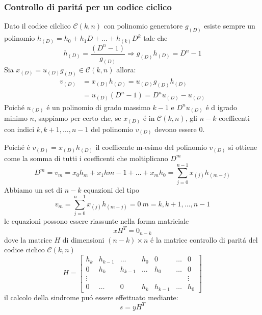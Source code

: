         \subsubsection{Controllo di paritá per un codice ciclico}
            Dato il codice cilclico $\mathcal{C}(k,n)$ con polinomio generatore $g_{(D)}$ esiste sempre un polinomio 
            $h_{(D)} = h_0+h_1D+\dots+h_{(k)}D^k$ tale che 
            \[
                h_{(D)} = \frac{(D^n-1)}{g_{(D)}} \Rightarrow g_{(D)}h_{(D)} = D^n-1    
            \]
            Sia $x_{(D)} = u_{(D)}g_{(D)}\in \mathcal{C}(k,n)$ allora:
            \begin{align}
                v_{(D)} &= x_{(D)}h_{(D)} = u_{(D)}g_{(D)}h_{(D)}\nonumber \\
                        &= u_{(D)}(D^n-1) = D^nu_{(D)}-u_{(D)}\nonumber
            \end{align}
            Poiché $u_{(D)}$ é un polinomio di grado massimo $k-1$ e $D^nu_{(D)}$ é d igrado minimo $n$,
            sappiamo per certo che, se $x_{(D)}$ é in $\mathcal{C}(k,n)$, gli $n-k$ coefficenti con indici
            $k,k+1,\dots,n-1$ del polinomio $v_{(D)}$ devono essere $0$.

            Poiché é $v_{(D)} = x_{(D)}h_{(D)}$ il coefficente m-esimo del polinomio $v_{(D)}$ si 
            ottiene come la somma di tutti i coefficenti che moltiplicano $D^m$
            \[
                D^m = v_m = x_0h_m+x_1h{m-1}+\dots+x_mh_0 = \sum_{j=0}^{n-1}x_{(j)}h_{(m-j)}  
            \] 
            Abbiamo un set di $n-k$ equazioni del tipo 
            \[
                v_m =  \sum_{j=0}^{n-1}x_{(j)}h_{(m-j)} = 0\ m=k,k+1,\dots,n-1  
            \]
            le equazioni possono essere riassunte nella forma matriciale
            \[
                xH^T=0_{n-k}  
            \]
            dove la matrice $H$ di dimensioni $(n-k)\times n$ é la matrice controllo di paritá del codice ciclico $\mathcal{C}(k,n)$ 
            \[
                H = 
                \begin{bmatrix}
                h_k & h_{k-1} & \dots & h_{0} & 0 & \dots & 0\\ 
                0 & h_k & h_{k-1} & \dots & h_{0} & \dots & 0\\ 
                \vdots &  &  &  &  &  & \vdots\\ 
                0 & \dots & 0 & h_{k}& h_{k-1} & \dots  & h_0
                \end{bmatrix}
            \]
            il calcolo della sindrome puó essere effettuato mediante:
            \[
                s = yH^T    
            \]
